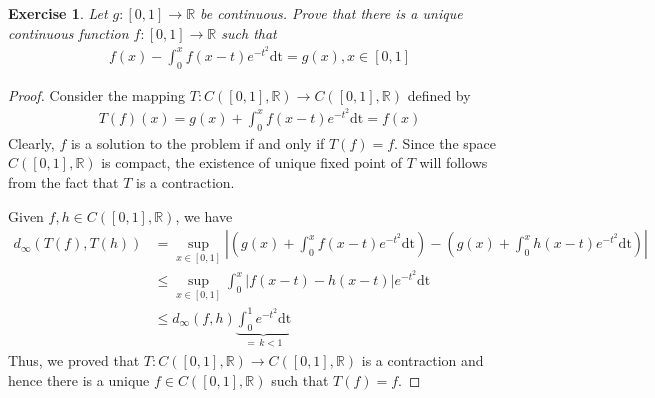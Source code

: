 \documentclass[12pt,leqno]{amsart}
\newtheorem{exercise}{Exercise}[section]
\theoremstyle{definition}
\numberwithin{equation}{subsection}
\begin{document}
\begin{exercise}
Let $g:[0,1]\to\mathbb{R}$ be continuous. Prove that there is a unique continuous function $f:[0,1]\to\mathbb{R}$ such that 
\begin{align*}
    f(x) - \int^x_0 f(x - t)e^{-t^2} \text{dt} = g(x), x\in [0,1]
\end{align*}
\end{exercise}
\begin{proof}
Consider the mapping $T:C([0,1],\mathbb{R})\to C([0,1],\mathbb{R})$ defined by 
\begin{align*}
    T(f)(x) = g(x) + \int^x_0 f(x - t)e^{-t^2} \text{dt} = f(x)
\end{align*}
Clearly, $f$ is a solution to the problem if and only if $T(f) = f$. Since the space $C([0,1],\mathbb{R})$ is compact, the existence of unique fixed point of $T$ will follows from the fact that $T$ is a contraction.

Given $f,h\in C([0,1],\mathbb{R})$, we have 
\begin{align*}
    d_\infty \left(T(f), T(h)\right)  & = \sup_{x\in[0,1]} \left|\left(g(x) + \int^x_0 f(x - t)e^{-t^2} \text{dt}\right) -  \left(g(x) + \int^x_0 h(x - t)e^{-t^2} \text{dt}\right)\right| \\
    & \leq \sup_{x\in[0,1]} \int^x_0 \left|f(x-t) - h(x-t)\right|e^{-t^2} \text{dt} \\
    & \leq d_\infty(f,h) \underbrace{\int^1_0 e^{-t^2} \text{dt}}_{=\, k < 1}
\end{align*}
Thus, we proved that $T:C([0,1],\mathbb{R})\to C([0,1],\mathbb{R})$ is a contraction and hence there is a unique $f\in C([0,1],\mathbb{R})$ such that $T(f) = f$.
\end{proof} 
\end{document}
